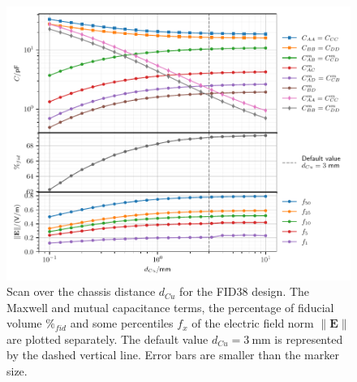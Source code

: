 \begin{figure}
\centering
\includegraphics[scale=1]{Figures/ElectrodesScan/capacitance_fiducial_cu_distance.pdf}
\caption{Scan over the chassis distance $d_{Cu}$ for the FID38 design. The Maxwell and mutual capacitance terms, the percentage of fiducial volume $\%_{fid}$ and some percentiles $f_x$ of the electric field norm $\| \mathbf{E} \|$ are plotted separately. The default value $d_{Cu}=\SI{3}{\mm}$ is represented by the dashed vertical line. Error bars are smaller than the marker size.}
\label{fig:capacitance-fiducial-cu-distance}
\end{figure}

